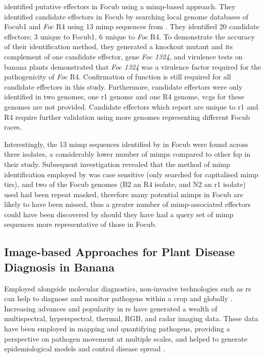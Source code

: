 \textcite{Chang2020} identified putative effectors in \ac{Focub} using a \ac{mimp}-based approach. They identified candidate effectors in \ac{Focub} by searching local genome databases of \ac{Focub1} and \textit{Foc} R4 using 13 \ac{mimp} sequences from \textcite{Dam2016}. They identified 20 candidate effectors; 3 unique to \ac{Focub1}, 6 unique to \textit{Foc} R4. To demonstrate the accuracy of their identification method, they generated a knockout mutant and its complement of one candidate effector, gene \textit{Foc 1324}, and virulence tests on banana plants demonstrated that \textit{Foc 1324} was a virulence factor required for the pathogenicity of \textit{Foc} R4. Confirmation of function is still required for all candidate effectors in this study. Furthermore, candidate effectors were only identified in two genomes, one \ac{r1} genome and one R4 genome, \acp{vcg} for these genomes are not provided. Candidate effectors which \textcite{Chang2020} report are unique to \ac{r1} and R4 require further validation using more genomes representing different \ac{Focub} races.

Interestingly, the 13 mimp sequences identified by \textcite{Dam2016} in \ac{Focub} were found across three isolates, a considerably lower number of \acp{mimp} compared to other \ac{fsp} in their study. Subsequent investigation revealed that the method of \ac{mimp} identification employed by \textcite{Dam2016} was case sensitive (only searched for capitalised \ac{mimp} \acp{tir}), and two of the \ac{Focub} genomes (B2 an R4 isolate, and N2 an \ac{r1} isolate) used had been repeat masked, therefore many potential \acp{mimp} in \ac{Focub} are likely to have been missed, thus a greater number of \ac{mimp}-associated effectors could have been discovered by \textcite{Chang2020} should they have had a query set of \ac{mimp} sequences more representative of those in \ac{Focub}.

\subsection{Image-based Approaches for Plant Disease Diagnosis in Banana}

Employed alongside molecular diagnostics, non-invasive technologies such as \ac{rs} can help to diagnose and monitor pathogens within a crop and globally \parencite{West2010}. Increasing advances and popularity in \ac{rs} have generated a wealth of multispectral, hyperspectral, thermal, RGB, and radar imaging data. These data have been employed in mapping and quantifying pathogens, providing a perspective on pathogen movement at multiple scales, and helped to generate epidemiological models and control disease spread \parencite{Zhang2019}.


